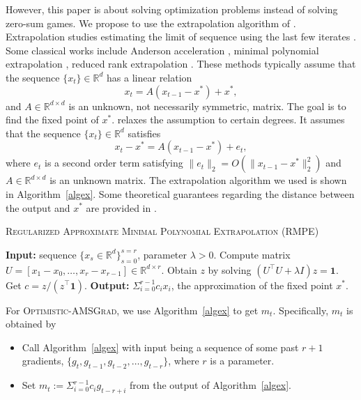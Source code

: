 \documentclass[11pt]{article}
\theoremstyle{k}
\begin{document}
However, this paper is about solving optimization problems instead of solving zero-sum games. 
We propose to use the extrapolation algorithm of \cite{SAB16}.
Extrapolation studies estimating the limit of sequence using the last few iterates
\cite{BZ13}. 
Some classical works include Anderson acceleration \cite{WN11}, minimal polynomial extrapolation \cite{CJ76}, reduced rank extrapolation \cite{E79}.
These methods typically assume that the sequence $\{x_t\} \in \mathbb R^d$
has a linear relation
\begin{equation} \label{vvv}
x_t = A( x_{t-1} - x^* ) + x^*,
\end{equation}
and $A \in \mathbb R^{d \times d}$ is an unknown, not necessarily symmetric, matrix.
The goal is to find the fixed point of $x^{*}$.
\cite{SAB16} relaxes the assumption to certain degrees.
It assumes that the sequence $\{x_t\} \in \mathbb R^d$ satisfies
\begin{equation} \label{nox}
x_t - x^* = A( x_{t-1} - x^* ) + e_t,
\end{equation}
where $e_t$ is a second order term satisfying $\| e_t \|_2  = O( \| x_{t-1} - x^* \|_2^2)$
and $A \in \mathbb R^{d \times d}$ is an unknown matrix.
The extrapolation algorithm we used is shown in Algorithm~\ref{algex}.
Some theoretical guarantees regarding the distance between the output and $x^*$ are provided in \cite{SAB16}.

\begin{algorithm}[h]
\begin{algorithmic}[1] 
\small
\caption{\textsc{Regularized Approximate Minimal Polynomial Extrapolation} (RMPE)
\cite{SAB16} } \label{algex}
\STATE \textbf{Input:} sequence $\{ x_s \in \mathbb R^d \}_{s=0}^{s=r}$, parameter $\lambda > 0$.
\STATE Compute matrix  $U = [ x_1 - x_0, \dots, x_{r} - x_{r-1}] \in \mathbb R^{d \times r}$.
\STATE Obtain $z$ by solving $(U^\top U + \lambda I ) z = \mathbf{1}$.
\STATE Get $c= z / (z^\top \mathbf{1})$.
\STATE \textbf{Output:} $\Sigma_{i=0}^{r-1} c_i x_i$, the approximation of the fixed point $x^*$.
\end{algorithmic}
\end{algorithm}


For \textsc{Optimistic-AMSGrad},
we use Algorithm~\ref{algex} to get $m_t$.
Specifically, $m_t$ is obtained by
\begin{itemize}
\item Call Algorithm~\ref{algex} with input being a sequence of some past $r+1$ gradients, $\{ g_t, g_{t-1},g_{t-2}, \dots, g_{t-r} \}$, %
where $r$ is a parameter.
\item Set $m_t:= \Sigma_{i=0}^{r-1} c_i g_{t-r+i}$ from the output of Algorithm~\ref{algex}.
\end{itemize}
\end{document}
